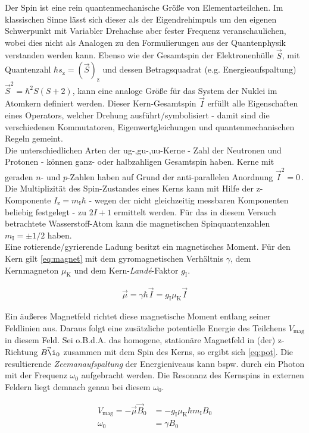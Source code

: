 \documentclass[numbers=noenddot,a4paper,notitlepage,twoside,BCOR15mm]{scrartcl}
\newcommand{\ix}[1]{_\text{#1}}
\newcommand{\tilt}[1]{\textit{#1}}
\begin{document}
			Der Spin ist eine rein quantenmechanische Größe von Elementarteilchen. Im klassischen Sinne lässt sich dieser als der Eigendrehimpuls um den eigenen Schwerpunkt mit Variabler Drehachse aber fester Frequenz veranschaulichen, wobei dies nicht als Analogen zu den Formulierungen aus der Quantenphysik verstanden werden kann. Ebenso wie der Gesamtspin der Elektronenhülle $\vec{S}$, mit Quantenzahl $\hbar s\ix{z}=(\vec{S})\ix{z}$ und dessen Betragsquadrat (e.g. Energieaufspaltung) $\vec{S}^2=\hbar^2 S(S+2)$, kann eine analoge Größe für das System der Nuklei im Atomkern definiert werden. Dieser Kern-Gesamtspin $\vec{I}$ erfüllt alle Eigenschaften eines Operators, welcher Drehung ausführt/symbolisiert - damit sind die verschiedenen Kommutatoren, Eigenwertgleichungen und quantenmechanischen Regeln gemeint.\\
			Die unterschiedlichen Arten der ug-,gu-,uu-Kerne - Zahl der Neutronen und Protonen -  können ganz- oder halbzahligen Gesamtspin haben. Kerne mit geraden $n$- und $p$-Zahlen haben auf Grund der anti-parallelen Anordnung $\vec{I}^2 =0\,$. Die Multiplizität des Spin-Zustandes eines Kerns kann mit Hilfe der z-Komponente $I\ix{z}=m\ix{I}\hbar$ - wegen der nicht gleichzeitig messbaren Komponenten beliebig festgelegt - zu $2I+1$ ermittelt werden. Für das in diesem Versuch betrachtete Wasserstoff-Atom kann die magnetischen Spinquantenzahlen $m\ix{I}=\pm 1/2$ haben.\\
			Eine rotierende/gyrierende Ladung besitzt ein magnetisches Moment. Für den Kern gilt \autoref{eq:magnet} mit dem gyromagnetischen Verhältnis $\gamma$, dem Kernmagneton $\mu\ix{K}$ und dem Kern-\tilt{Landé}-Faktor $g\ix{I}$.

				\begin{align}
					\vec{\mu}=\gamma\hbar\vec{I}=g\ix{I}\mu\ix{K}\vec{I} \label{eq:magnet}
				\end{align}

			Ein äußeres Magnetfeld richtet diese magnetische Moment entlang seiner Feldlinien aus. Daraus folgt eine zusätzliche potentielle Energie des Teilchens $V\ix{mag}$ in diesem Feld. Sei o.B.d.A. das homogene, stationäre Magnetfeld in (der) z-Richtung $\vec{B\i}\ix{0}$ zusammen mit dem Spin des Kerns, so ergibt sich \autoref{eq:pot}. Die resultierende \tilt{Zeemanaufspaltung} der Energieniveaus kann bspw. durch ein Photon mit der Frequenz $\omega\ix{0}$ aufgebracht werden. Die Resonanz des Kernspins in externen Feldern liegt demnach genau bei diesem $\omega\ix{0}$.

				\begin{align}
					V\ix{mag}=-\vec{\mu}\vec{B}\ix{0}&=-g\ix{I}\mu\ix{K}\hbar m\ix{I}B\ix{0} \label{eq:pot} \\
					\omega\ix{0}&=\gamma B\ix{0} \label{eq:resonanz}
				\end{align}
\end{document}
